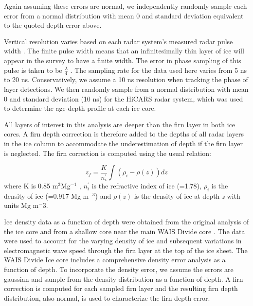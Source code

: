 \documentclass[12pt]{article}
\begin{document}
Again assuming these errors are normal, we independently randomly sample each error from a normal distribution with mean 0 and standard deviation equivalent to the quoted depth error above. 

Vertical resolution varies based on each radar system's measured radar pulse width \citep{millar1982}. The finite pulse width means that an infinitesimally thin layer of ice will appear in the survey to have a finite width. The error in phase sampling of this pulse is taken to be $\frac{\lambda}{4}$%
. The sampling rate for the data used here varies from 5 ns to 20 ns. Conservatively, we assume a 10 ns resolution when tracking the phase of layer detections. We then randomly sample from a normal distribution with mean 0 and standard deviation %
(10 ns) for the HiCARS radar system, which was used to determine the age-depth profile at each ice core.  

All layers of interest in this analysis are deeper than the firn layer in both ice cores. A firn depth correction is therefore added to the depths of all radar layers in the ice column to accommodate the underestimation of depth if the firn layer is neglected. The firn correction is computed using the usual \citet{dowdeswell2004} relation:

\begin{equation}
z_f = \frac{K}{n^{'}_{i}}\int{(\rho_{i} - \rho(z)) dz}
\end{equation}
where K is 0.85 m$^{3}$Mg$^{-1}$ \citep{Robin1969}, $n^{'}_{i}$ is the refractive index of ice (=1.78), $\rho_{i}$ is the density of ice (=0.917 Mg m$^{-3}$) and $\rho(z)$ is the density of ice at depth \textit{z} with units Mg m$^-3$.

Ice density data as a function of depth were obtained from the original analysis of the ice core \citep{gow1968} and from a shallow core near the main WAIS Divide core \citep{kreutz2011}. The data were used to account for the varying density of ice and subsequent variations in electromagnetic wave speed through the firn layer at the top of the ice sheet.  The WAIS Divide Ice core includes a comprehensive density error analysis as a function of depth. To incorporate the density error, we assume the errors are gaussian and sample from the density distribution as a function of depth. A firn correction is computed for each sampled firn layer and the resulting firn depth distribution, also normal, is used to characterize the firn depth error. 
\end{document}

